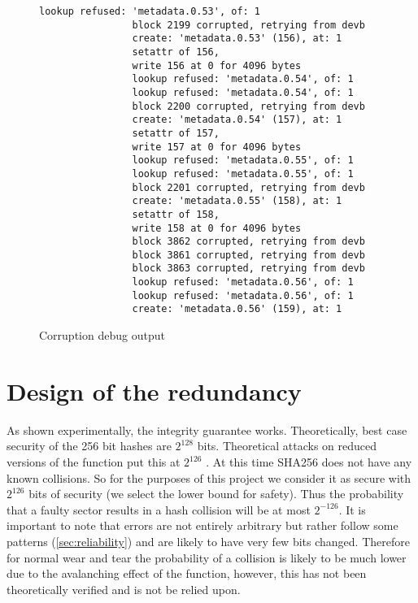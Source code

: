         \begin{figure}[h]
            \caption{Corruption debug output}
            \label{fig:corruption}
            \begin{lstlisting}[gobble=16]
                lookup refused: 'metadata.0.53', of: 1
                block 2199 corrupted, retrying from devb
                create: 'metadata.0.53' (156), at: 1
                setattr of 156,
                write 156 at 0 for 4096 bytes
                lookup refused: 'metadata.0.54', of: 1
                lookup refused: 'metadata.0.54', of: 1
                block 2200 corrupted, retrying from devb
                create: 'metadata.0.54' (157), at: 1
                setattr of 157,
                write 157 at 0 for 4096 bytes
                lookup refused: 'metadata.0.55', of: 1
                lookup refused: 'metadata.0.55', of: 1
                block 2201 corrupted, retrying from devb
                create: 'metadata.0.55' (158), at: 1
                setattr of 158,
                write 158 at 0 for 4096 bytes
                block 3862 corrupted, retrying from devb
                block 3861 corrupted, retrying from devb
                block 3863 corrupted, retrying from devb
                lookup refused: 'metadata.0.56', of: 1
                lookup refused: 'metadata.0.56', of: 1
                create: 'metadata.0.56' (159), at: 1
            \end{lstlisting}
        \end{figure}

    \section{Design of the redundancy}

        As shown experimentally, the integrity guarantee works. Theoretically,
        best case security of the 256 bit hashes are $2^{128}$ bits.
        Theoretical attacks on reduced versions of the function put this at
        $2^{126}$ \cite{sha2_security, sha2_analysis}. At this time
        SHA256 does not have any known collisions. So for the purposes of this
        project we consider it as secure with $2^{126}$ bits of security (we
        select the lower bound for safety). Thus the probability that a faulty
        sector results in a hash collision will be at most $2^{-126}$. It is
        important to note that errors are not entirely arbitrary but rather
        follow some patterns (\autoref{sec:reliability}) and are likely to have
        very few bits changed. Therefore for normal wear and tear the
        probability of a collision is likely to be much lower due to the
        avalanching effect of the function, however, this has not been
        theoretically verified and is not be relied upon.

